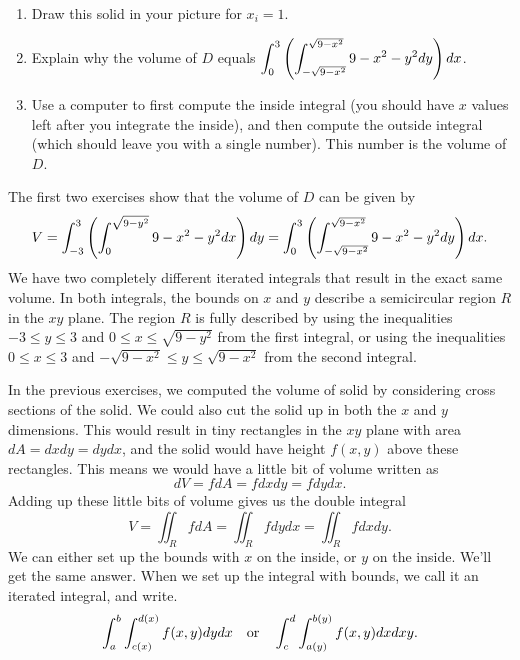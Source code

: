 \begin{challenge}
\begin{enumerate}[resume]
	\item Draw this solid in your picture for $x_i = 1$. 
	\item Explain why the volume of $D$ equals $\displaystyle\int_{0}^{3} \left(\int_{-\sqrt{9-x^2}}^{\sqrt{9-x^2}}9-x^2-y^2 dy\right) dx$.
	\item Use a computer to first compute the inside integral (you should have $x$ values left after you integrate the inside), and then compute the outside integral (which should leave you with a single number). This number is the volume of $D$. 
\end{enumerate}
\end{challenge}

The first two exercises show that the volume of $D$ can be given by 
$$V=\displaystyle\int_{-3}^{3} \left(\int_0^{\sqrt{9-y^2}}9-x^2-y^2 dx\right) dy = \displaystyle\int_{0}^{3} \left(\int_{-\sqrt{9-x^2}}^{\sqrt{9-x^2}}9-x^2-y^2 dy\right) dx.$$
We have two completely different iterated integrals that result in the exact same volume. In both integrals, the bounds on $x$ and $y$ describe a semicircular region $R$ in the $xy$ plane. The region $R$ is fully described by using the inequalities $-3\leq y\leq 3$ and $0\leq x\leq \sqrt{9-y^2}$ from the first integral, or using the inequalities $0\leq x\leq 3$ and $-\sqrt{9-x^2}\leq y\leq \sqrt{9-x^2}$ from the second integral.



In the previous exercises, we computed the volume of solid by considering cross sections of the solid.  We could also cut the solid up in both the $x$ and $y$ dimensions.  This would result in tiny rectangles in the $xy$ plane with area $dA=dxdy=dydx$, and the solid would have height $f(x,y)$ above these rectangles.  This means we would have a little bit of volume written as  
$$dV=fdA=fdxdy=fdydx.$$ 
Adding up these little bits of volume gives us the double integral 
$$V = \iint_R fdA=\iint_R fdydx=\iint_R fdxdy.$$
We can either set up the bounds with $x$ on the inside, or $y$ on the inside. We'll get the same answer.  When we set up the integral with bounds, we call it an iterated integral, and write.
$$\displaystyle \int_a^b \int_{c(x)}^{d(x)}f(x,y)dydx \quad \text{or} \quad
\displaystyle \int_c^d \int_{a(y)}^{b(y)}f(x,y)dxdxy.$$

